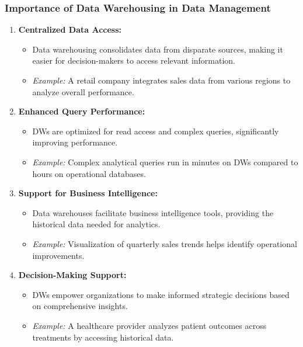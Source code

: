 \documentclass[aspectratio=169]{beamer}
\begin{document}
\begin{frame}[fragile]
    \frametitle{Importance of Data Warehousing in Data Management}
    \begin{enumerate}
        \item \textbf{Centralized Data Access:}
            \begin{itemize}
                \item Data warehousing consolidates data from disparate sources, making it easier for decision-makers to access relevant information.
                \item \textit{Example:} A retail company integrates sales data from various regions to analyze overall performance.
            \end{itemize}
            
        \item \textbf{Enhanced Query Performance:}
            \begin{itemize}
                \item DWs are optimized for read access and complex queries, significantly improving performance.
                \item \textit{Example:} Complex analytical queries run in minutes on DWs compared to hours on operational databases.
            \end{itemize}
        
        \item \textbf{Support for Business Intelligence:}
            \begin{itemize}
                \item Data warehouses facilitate business intelligence tools, providing the historical data needed for analytics.
                \item \textit{Example:} Visualization of quarterly sales trends helps identify operational improvements.
            \end{itemize}

        \item \textbf{Decision-Making Support:}
            \begin{itemize}
                \item DWs empower organizations to make informed strategic decisions based on comprehensive insights.
                \item \textit{Example:} A healthcare provider analyzes patient outcomes across treatments by accessing historical data.
            \end{itemize}
    \end{enumerate}
\end{frame}
\end{document}
